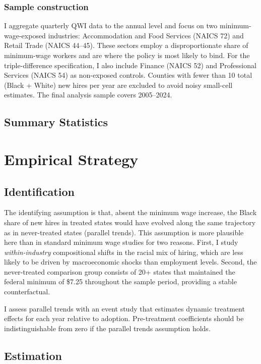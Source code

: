 \documentclass[12pt]{article}
\begin{document}
\subsubsection*{Sample construction}  I aggregate quarterly QWI data to the annual level and focus on two minimum-wage-exposed industries: Accommodation and Food Services (NAICS 72) and Retail Trade (NAICS 44--45). These sectors employ a disproportionate share of minimum-wage workers and are where the policy is most likely to bind. For the triple-difference specification, I also include Finance (NAICS 52) and Professional Services (NAICS 54) as non-exposed controls. Counties with fewer than 10 total (Black + White) new hires per year are excluded to avoid noisy small-cell estimates. The final analysis sample covers 2005--2024.

\subsection{Summary Statistics}




\section{Empirical Strategy}

\subsection{Identification}

The identifying assumption is that, absent the minimum wage increase, the Black share of new hires in treated states would have evolved along the same trajectory as in never-treated states (parallel trends). This assumption is more plausible here than in standard minimum wage studies for two reasons. First, I study \textit{within-industry} compositional shifts in the racial mix of hiring, which are less likely to be driven by macroeconomic shocks than employment levels. Second, the never-treated comparison group consists of 20+ states that maintained the federal minimum of \$7.25 throughout the sample period, providing a stable counterfactual.

I assess parallel trends with an event study that estimates dynamic treatment effects for each year relative to adoption. Pre-treatment coefficients should be indistinguishable from zero if the parallel trends assumption holds.

\subsection{Estimation}
\end{document}
